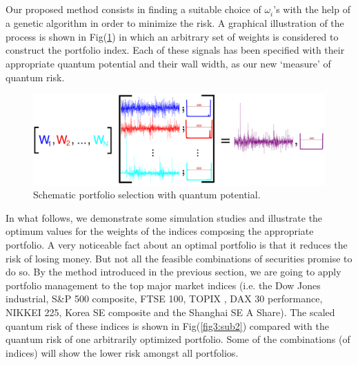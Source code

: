 \documentclass[journal,article,submit,moreauthors,pdftex]{Definitions/mdpi}
\begin{document}
Our proposed method consists in finding a suitable choice of $\omega
_{i}^{{}}$'s with the help of a genetic algorithm in order to minimize the
risk. A graphical illustration of the process is shown in Fig(\ref{fig:2})
in which an arbitrary set of weights is considered to construct the
portfolio index. Each of these signals has been specified with their
appropriate quantum potential and their wall width, as our new `measure' of
quantum risk.\newline
\begin{figure}[tbh]
	\centering
	\includegraphics[width=120mm]{new1_fig0.png}
	\caption{Schematic portfolio selection with quantum potential.}
	\label{fig:2}
\end{figure}
\newpage In what follows, we demonstrate some simulation studies and
illustrate the optimum values for the weights of the indices composing the
appropriate portfolio. A very noticeable fact about an optimal portfolio is
that it reduces the risk of losing money. But not all the feasible
combinations of securities promise to do so. By the method introduced in the
previous section, we are going to apply portfolio management to the top
major market indices (i.e. the Dow Jones industrial, S\&P 500 composite,
FTSE 100, TOPIX , DAX 30 performance, NIKKEI 225, Korea SE composite and the
Shanghai SE A Share). The scaled quantum risk of these indices is shown in
Fig(\ref{fig3:sub2}) compared with the quantum risk of one arbitrarily
optimized portfolio. Some of the combinations (of indices) will show the
lower risk amongst all portfolios.
\end{document}
